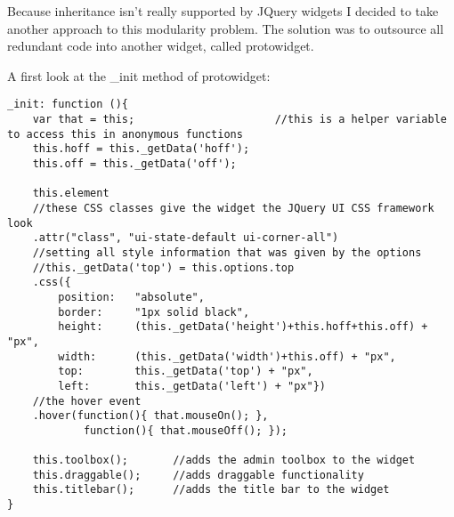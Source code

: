     Because inheritance isn't really supported by JQuery widgets I decided to take another approach to this modularity problem. The solution was to outsource all redundant code into another widget, called protowidget.

    A first look at the \_init method of protowidget:
\begin{lstlisting}[caption=prototype widget - init: ui.protowidget.js ,label=lst:h2h:protowidgetinit]
_init: function (){
	var that = this;                      //this is a helper variable to access this in anonymous functions
	this.hoff = this._getData('hoff');
	this.off = this._getData('off');
	
	this.element
    //these CSS classes give the widget the JQuery UI CSS framework look
	.attr("class", "ui-state-default ui-corner-all")
    //setting all style information that was given by the options
    //this._getData('top') = this.options.top
	.css({
		position: 	"absolute",
		border: 	"1px solid black",
		height: 	(this._getData('height')+this.hoff+this.off) + "px",
		width:		(this._getData('width')+this.off) + "px",
		top: 		this._getData('top') + "px",
		left: 		this._getData('left') + "px"})
    //the hover event
	.hover(function(){ that.mouseOn(); },
			function(){ that.mouseOff(); });   	

	this.toolbox();       //adds the admin toolbox to the widget
	this.draggable();     //adds draggable functionality
	this.titlebar();      //adds the title bar to the widget
}
\end{lstlisting}

